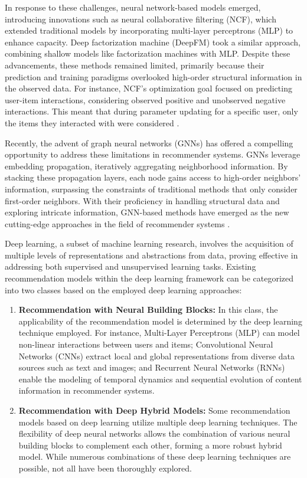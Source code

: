 In response to these challenges, neural network-based models \cite{cheng2016wide} \cite{guo2017deepfm} \cite{he2017neural} emerged, introducing innovations such as neural collaborative filtering (NCF), which extended traditional models by incorporating multi-layer perceptrons (MLP) to enhance capacity. Deep factorization machine (DeepFM) \cite{guo2017deepfm} took a similar approach, combining shallow models like factorization machines \cite{rendle2010factorization} with MLP. Despite these advancements, these methods remained limited, primarily because their prediction and training paradigms overlooked high-order structural information in the observed data. For instance, NCF's optimization goal focused on predicting user-item interactions, considering observed positive and unobserved negative interactions. This meant that during parameter updating for a specific user, only the items they interacted with were considered \cite{gao2023survey}.

Recently, the advent of graph neural networks (GNNs) has offered a compelling opportunity to address these limitations in recommender systems. GNNs leverage embedding propagation, iteratively aggregating neighborhood information. By stacking these propagation layers, each node gains access to high-order neighbors' information, surpassing the constraints of traditional methods that only consider first-order neighbors. With their proficiency in handling structural data and exploring intricate information, GNN-based methods have emerged as the new cutting-edge approaches in the field of recommender systems \cite{gao2023survey}.

Deep learning, a subset of machine learning research, involves the acquisition of multiple levels of representations and abstractions from data, proving effective in addressing both supervised and unsupervised learning tasks. Existing recommendation models within the deep learning framework can be categorized into two classes based on the employed deep learning approaches\cite{zhang2019deep}:
\begin{enumerate}
    \item \textbf{Recommendation with Neural Building Blocks:} In this class, the applicability of the recommendation model is determined by the deep learning technique employed. For instance, Multi-Layer Perceptrons (MLP) can model non-linear interactions between users and items; Convolutional Neural Networks (CNNs) extract local and global representations from diverse data sources such as text and images; and Recurrent Neural Networks (RNNs) enable the modeling of temporal dynamics and sequential evolution of content information in recommender systems.
    \item \textbf{Recommendation with Deep Hybrid Models:} Some recommendation models based on deep learning utilize multiple deep learning techniques. The flexibility of deep neural networks allows the combination of various neural building blocks to complement each other, forming a more robust hybrid model. While numerous combinations of these deep learning techniques are possible, not all have been thoroughly explored.
\end{enumerate}

